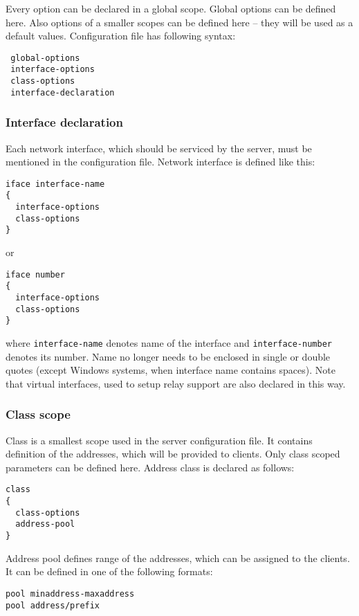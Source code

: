 Every option can be declared in a global scope. Global options can be
defined here. Also options of a smaller scopes can be defined here --
they will be used as a default values. Configuration file has following syntax:

\begin{verbatim}
 global-options
 interface-options
 class-options          
 interface-declaration
\end{verbatim}

\subsubsection{Interface declaration}
Each network interface, which should be serviced by the server, must be
mentioned in the configuration file. Network interface is defined like this:
\begin{verbatim}
iface interface-name
{
  interface-options
  class-options        
}
\end{verbatim}

or 

\begin{verbatim}
iface number 
{
  interface-options
  class-options        
}
\end{verbatim}

where \verb+interface-name+ denotes name of the interface and
\verb+interface-number+ denotes its number. Name no longer needs to be
enclosed in single or double quotes (except Windows systems, when
interface name contains spaces). Note that virtual interfaces, used
to setup relay support are also declared in this way.

\subsubsection{Class scope}
Class is a smallest scope used in the server configuration file. It
contains definition of the addresses, which will be provided to
clients. Only class scoped parameters can be defined here. Address class
is declared as follows:
\begin{verbatim}
class
{  
  class-options
  address-pool    
}
\end{verbatim}

Address pool defines range of the addresses, which can be assigned to the
clients. It can be defined in one of the following formats:
\begin{verbatim}
pool minaddress-maxaddress
pool address/prefix
\end{verbatim}

